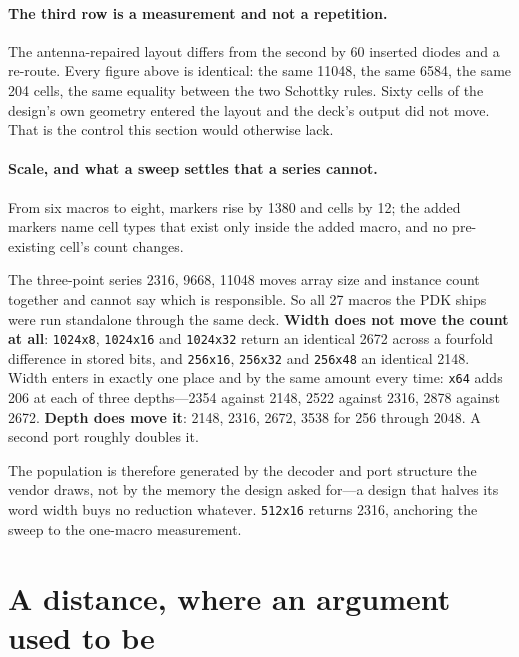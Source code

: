 \documentclass[11pt,a4paper]{article}
\begin{document}
\paragraph{The third row is a measurement and not a repetition.} The
antenna-repaired layout differs from the second by \num{60} inserted
diodes and a re-route. Every figure above is identical: the same
\num{11048}, the same \num{6584}, the same \num{204} cells, the same
equality between the two Schottky rules. Sixty cells of the design's own
geometry entered the layout and the deck's output did not move. That is
the control this section would otherwise lack.

\paragraph{Scale, and what a sweep settles that a series cannot.} From
six macros to eight, markers rise by \num{1380} and cells by \num{12};
the added markers name cell types that exist only inside the added
macro, and no pre-existing cell's count changes.

The three-point series \num{2316}, \num{9668}, \num{11048} moves array
size and instance count together and cannot say which is responsible. So
all \num{27} macros the PDK ships were run standalone through the same
deck. \textbf{Width does not move the count at all}: \texttt{1024x8},
\texttt{1024x16} and \texttt{1024x32} return an identical \num{2672}
across a fourfold difference in stored bits, and \texttt{256x16},
\texttt{256x32} and \texttt{256x48} an identical \num{2148}. Width
enters in exactly one place and by the same amount every time:
\texttt{x64} adds \num{206} at each of three depths---\num{2354}
against \num{2148}, \num{2522} against \num{2316}, \num{2878} against
\num{2672}. \textbf{Depth does move it}: \num{2148}, \num{2316},
\num{2672}, \num{3538} for \num{256} through \num{2048}. A second
port roughly doubles it.

The population is therefore generated by the decoder and port structure
the vendor draws, not by the memory the design asked for---a design that
halves its word width buys no reduction whatever. \texttt{512x16}
returns \num{2316}, anchoring the sweep to the one-macro measurement.

\section{A distance, where an argument used to be}
\label{sec:distance}
\end{document}
